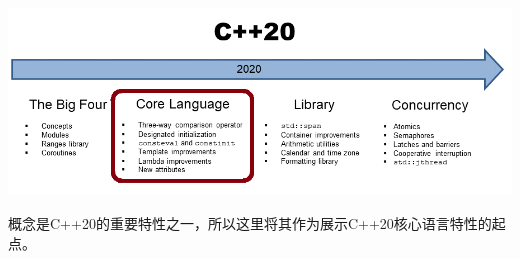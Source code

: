 
\begin{center}
\includegraphics[width=1.0\textwidth]{content/3/chapter4/images/1.png}\\
\end{center}

概念是C++20的重要特性之一，所以这里将其作为展示C++20核心语言特性的起点。
